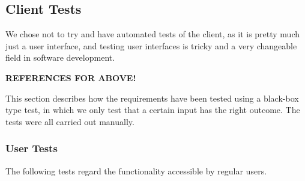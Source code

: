 \subsection{Client Tests}

We
chose not to try and have automated tests of the client, as it is pretty much
just a user interface, and testing user interfaces is tricky and a very
changeable field in software development.

\textbf{REFERENCES FOR ABOVE!}

This section describes how the requirements have been tested using a black-box type test, in which we only test that a certain input has the right outcome. The tests were all carried out manually.

\subsubsection{User Tests}
The following tests regard the functionality accessible by regular users. \\

